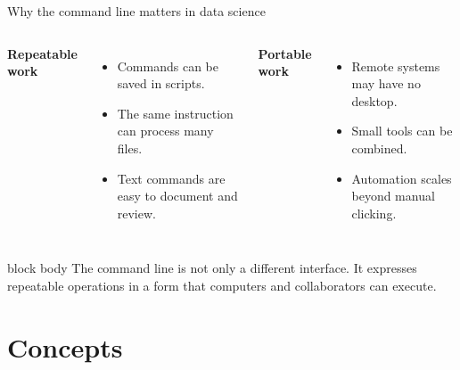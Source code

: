 \documentclass[10pt,aspectratio=169]{beamer}
\begin{document}
\begin{frame}{Why the command line matters in data science}

\small

\begin{columns}[T]


\textbf{Repeatable work}

\begin{itemize}
  \item Commands can be saved in scripts.
  \item The same instruction can process many files.
  \item Text commands are easy to document and review.
\end{itemize}


\textbf{Portable work}

\begin{itemize}
  \item Remote systems may have no desktop.
  \item Small tools can be combined.
  \item Automation scales beyond manual clicking.
\end{itemize}

\end{columns}

\vspace{0.50cm}

\begin{beamercolorbox}[rounded=true,sep=8pt]{block body}
The command line is not only a different interface. It expresses repeatable operations in a form that computers and collaborators can execute.
\end{beamercolorbox}

\end{frame}



\section{Concepts}
\end{document}
